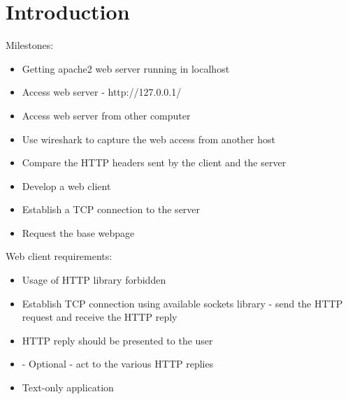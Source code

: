 \documentclass[11pt,a4paper]{report}
\begin{document}

\tableofcontents





\chapter{Introduction}
    Milestones:
    \begin{itemize}
        \item Getting apache2 web server running in localhost
        \item Access web server - http://127.0.0.1/
        \item Access web server from other computer
        \item Use wireshark to capture the web access from another host
        \item Compare the HTTP headers sent by the client and the server
        \item Develop a web client
        \item Establish a TCP connection to the server
        \item Request the base webpage
    \end{itemize}
    
    Web client requirements:
    \begin{itemize}
        \item Usage of HTTP library forbidden
        \item Establish TCP connection using available sockets library - send the HTTP request and receive the HTTP reply
        \item HTTP reply should be presented to the user
        \item - Optional - act to the various HTTP replies
        \item Text-only application
    \end{itemize}
\end{document}
